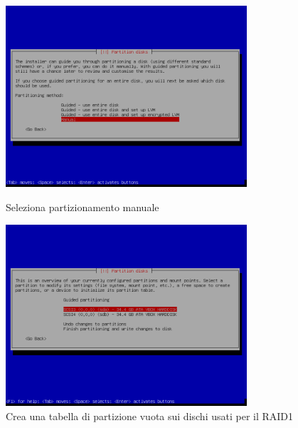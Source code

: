 \documentclass[11pt]{article}
\begin{document}
\begin{figure}[H]
    \includegraphics[width=0.8\textwidth, keepaspectratio]{../img/raid install/raid1.png}
    \centering
    \caption{Seleziona partizionamento manuale}

    \includegraphics[width=0.8\textwidth, keepaspectratio]{../img/raid install/raid2.png}
    \centering
    \caption{Crea una tabella di partizione vuota sui dischi usati per il RAID1}
\end{figure}
\end{document}
